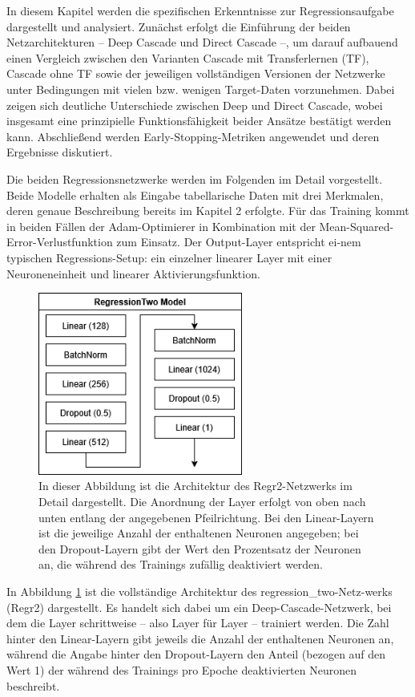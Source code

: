 In diesem Kapitel werden die spezifischen Erkenntnisse zur Regressionsaufgabe dargestellt und analysiert. Zunächst erfolgt die Einführung der 
beiden Netzarchitekturen – Deep Cascade und Direct Cascade –, um darauf aufbauend einen Vergleich zwischen den Varianten Cascade mit 
Transferlernen (TF), Cascade ohne TF sowie der jeweiligen vollständigen Versionen der Netzwerke unter Bedingungen mit vielen bzw. wenigen Target-Daten 
vorzunehmen. Dabei zeigen sich deutliche Unterschiede zwischen Deep und Direct Cascade, wobei insgesamt eine prinzipielle Funktionsfähigkeit 
beider Ansätze bestätigt werden kann. Abschließend werden Early-Stopping-Metriken angewendet und deren Ergebnisse diskutiert.

Die beiden Regressionsnetzwerke werden im Folgenden im Detail vorgestellt. Beide Modelle erhalten als Eingabe tabellarische Daten mit drei 
Merkmalen, deren genaue Beschreibung bereits im Kapitel 2 erfolgte. Für das Training kommt in beiden Fällen der 
Adam-Optimierer in Kombination mit der Mean-Squared-Error-Verlustfunktion zum Einsatz. Der Output-Layer entspricht ei-nem typischen 
Regressions-Setup: ein einzelner linearer Layer mit einer Neuroneneinheit und linearer Aktivierungsfunktion.

\begin{figure}[htpb]
    \centering
    \includegraphics[height=6cm]{../../Graphiken/regressiontwo_2.png}
    \caption{\label{fig:regr2} 
    \small{In dieser Abbildung ist die Architektur des Regr2-Netzwerks im Detail dargestellt. Die Anordnung der Layer erfolgt von oben nach 
    unten entlang der angegebenen Pfeilrichtung. Bei den Linear-Layern ist die jeweilige Anzahl der enthaltenen Neuronen angegeben; bei den 
    Dropout-Layern gibt der Wert den Prozentsatz der Neuronen an, die während des Trainings zufällig deaktiviert werden.}}
\end{figure}

In Abbildung \ref{fig:regr2} ist die vollständige Architektur des regression\_two-Netz-werks (Regr2) dargestellt. Es handelt sich dabei um ein 
Deep-Cascade-Netzwerk, 
bei dem die Layer schrittweise – also Layer für Layer – trainiert werden. Die Zahl hinter den Linear-Layern gibt jeweils die Anzahl der 
enthaltenen Neuronen an, während die Angabe hinter den Dropout-Layern den Anteil (bezogen auf den Wert 1) der während des Trainings pro 
Epoche deaktivierten Neuronen beschreibt.

